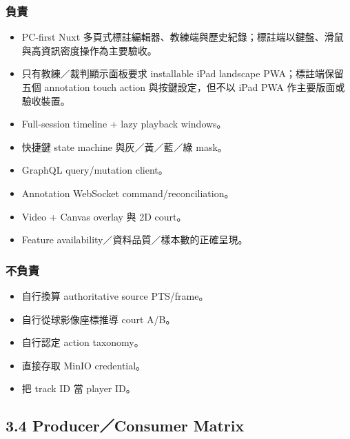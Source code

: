 \documentclass[
  9pt,
  a4paper,
]{article}
\providecommand{\tightlist}{%
  \setlength{\itemsep}{0pt}\setlength{\parskip}{0pt}}
\begin{document}
\subsubsection{負責}\label{ux8ca0ux8cac-1}

\begin{itemize}
\tightlist
\item
  PC-first Nuxt 多頁式標註編輯器、教練端與歷史紀錄；標註端以鍵盤、滑鼠與高資訊密度操作為主要驗收。
\item
  只有教練／裁判顯示面板要求 installable iPad landscape PWA；標註端保留五個 annotation touch action 與按鍵設定，但不以 iPad PWA 作主要版面或驗收裝置。
\item
  Full-session timeline + lazy playback windows。
\item
  快捷鍵 state machine 與灰／黃／藍／綠 mask。
\item
  GraphQL query/mutation client。
\item
  Annotation WebSocket command/reconciliation。
\item
  Video + Canvas overlay 與 2D court。
\item
  Feature availability／資料品質／樣本數的正確呈現。
\end{itemize}

\subsubsection{不負責}\label{ux4e0dux8ca0ux8cac-1}

\begin{itemize}
\tightlist
\item
  自行換算 authoritative source PTS/frame。
\item
  自行從球影像座標推導 court A/B。
\item
  自行認定 action taxonomy。
\item
  直接存取 MinIO credential。
\item
  把 track ID 當 player ID。
\end{itemize}

\subsection{3.4 Producer／Consumer
Matrix}\label{34-producerconsumer-matrix}
\end{document}
